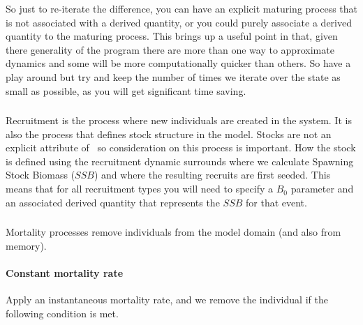 So just to re-iterate the difference, you can have an explicit maturing process that is not associated with a derived quantity, or you could purely associate a derived quantity to the maturing process. This brings up a useful point in that, given there generality of the program there are more than one way to approximate dynamics and some will be more computationally quicker than others. So have a play around but try and keep the number of times we iterate over the state as small as possible, as you will get significant time saving.


\subsubsection{}
Recruitment is the process where new individuals are created in the system. It is also the process that defines stock structure in the model. Stocks are not an explicit attribute of \IBM\ so consideration on this process is important. How the stock is defined using the recruitment dynamic surrounds where we calculate Spawning Stock Biomass ($SSB$) and where the resulting recruits are first seeded. This means that for all recruitment types you will need to specify a $B_0$ parameter and an associated derived quantity that represents the $SSB$ for that event.

\paragraph{}\label{subsubsec:constant-recruitment}

\paragraph{}\label{subsubsec:bev-holt-recruitment}


\subsubsection{\label{sec:mortality}}
Mortality processes remove individuals from the model domain (and also from memory).

\paragraph{Constant mortality rate}
Apply an instantaneous mortality rate, and we remove the individual if the following condition is met.


